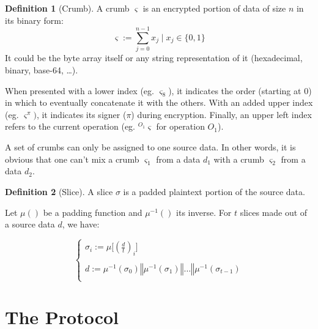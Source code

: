 \documentclass[twoside,twocolumn]{article}
\theoremstyle{definition}
\newtheorem{definition}{Definition}
\theoremstyle{remark}
\begin{document}
\begin{definition}[Crumb]
    \label{crumb}
    A crumb $\varsigma$ is an encrypted portion of data of size $n$ in its binary form:
    \begin{equation}
        \label{eq:crumb}
        \varsigma := \sum_{j=0}^{n-1} x_j \mid x_j \in \{ 0, 1 \}
    \end{equation}
    It could be the byte array itself or any string representation of it (hexadecimal, binary, base-64, \dots).

    When presented with a lower index (eg. $\varsigma_8$), it indicates the order (starting at $0$) in which to eventually concatenate it with the 
    others. With an added upper index (eg. $\varsigma^\pi)$, it indicates its signer ($\pi$) during encryption. Finally, an upper left index refers to 
    the current operation (eg. ${}^{O_1}\varsigma$ for operation $O_1$).

    A set of crumbs can only be assigned to one source data. In other words, it is obvious that one can't mix a crumb $\varsigma_1$ from a data $d_1$ 
    with a crumb $\varsigma_2$ from a data $d_2$.
\end{definition}

\begin{definition}[Slice]
    \label{slice}
    A slice $\sigma$ is a padded plaintext portion of the source data.

    Let $\mu()$ be a padding function and $\mu^{-1}()$ its inverse. For $t$ slices made out of a source data $d$, we have:
    \begin{small}
        \begin{equation}
            \label{eq:slice}
            \left\{
                \begin{array}{l}
                    \sigma_i := \mu \Big[ \left( \frac{d}{t} \right)_i \Big] \\ \\
                    d := \mu^{-1}(\sigma_0) \mathbin\Vert \mu^{-1}(\sigma_1) \mathbin\Vert \dots \mathbin\Vert \mu^{-1}(\sigma_{t-1}) \\
                \end{array}
            \right.
        \end{equation}
    \end{small}
\end{definition}


\section{The Protocol}
\end{document}
